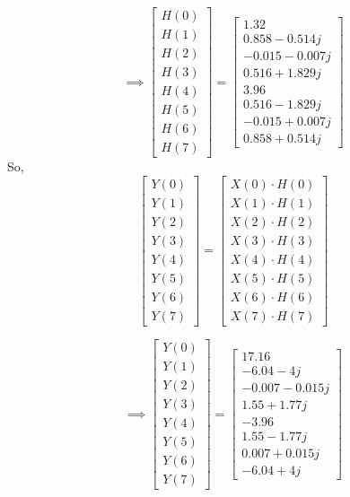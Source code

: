 \documentclass[journal,12pt,twocolumn]{IEEEtran}
\renewcommand\thesection{\arabic{section}}
\begin{document}
\begin{enumerate}[label=\thesection.\arabic*.,ref=\thesection.\theenumi]
\begin{equation}
\implies
\begin{bmatrix}
H(0) \\
H(1) \\
H(2) \\
H(3) \\
H(4) \\
H(5) \\
H(6) \\
H(7)
\end{bmatrix}
=
\begin{bmatrix}
1.32 \\
0.858 - 0.514j \\
-0.015-0.007j \\
0.516 +1.829j \\
3.96 \\
0.516 - 1.829j \\
-0.015+0.007j  \\
0.858 + 0.514j
\end{bmatrix}
\end{equation}
So,
\begin{equation}
\begin{bmatrix} 
Y(0) \\ Y(1) \\ Y(2) \\ Y(3) \\ Y(4) \\ Y(5) \\ Y(6) \\ Y(7) 
\end{bmatrix}
=
\begin{bmatrix}
X(0)\cdot H(0) \\ X(1)\cdot H(1) \\ X(2)\cdot H(2) \\ X(3)\cdot H(3) \\ X(4)\cdot H(4) \\ X(5)\cdot H(5) \\ X(6)\cdot H(6) \\ X(7)\cdot H(7)
\end{bmatrix}
\end{equation}

\begin{equation}
\implies
\begin{bmatrix}
Y(0) \\
Y(1) \\
Y(2) \\
Y(3) \\
Y(4) \\
Y(5) \\
Y(6) \\
Y(7)
\end{bmatrix}
=
\begin{bmatrix}
17.16 \\
-6.04 - 4j \\
-0.007-0.015j \\
1.55 +1.77j \\
-3.96 \\
1.55 -1.77j\\
0.007+0.015j  \\
-6.04 + 4j
\end{bmatrix}
\end{equation}


\end{enumerate}
\end{document}
